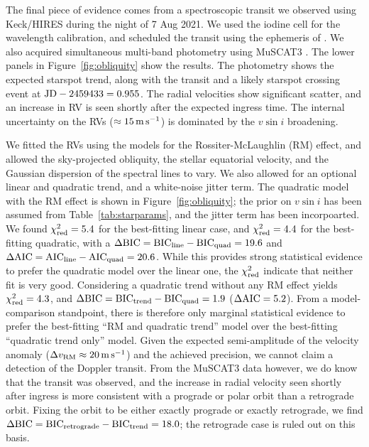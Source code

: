 \documentclass[12pt,modern,twocolumn,tighten]{aastex63}
\begin{document}
The final piece of evidence comes from a spectroscopic transit we
observed using Keck/HIRES during the night of 7 Aug 2021.  We
used the iodine cell for the wavelength calibration, and scheduled the
transit using the ephemeris of \citet{holczer_transit_2016}.  We also acquired
simultaneous multi-band photometry using MuSCAT3 \citep{Narita_2020}.
The lower panels in Figure~\ref{fig:obliquity} show the results.  The
photometry shows the expected starspot trend, along with the transit
and a likely starspot crossing event at ${\rm JD} - 2459433 = 0.955$.
The radial velocities show significant scatter, and an
increase in RV is seen shortly after the expected ingress time.  The
internal uncertainty on the RVs ($\approx 15\,{\rm m\,s}^{-1}$) is
dominated by the $v\sin i$ broadening.

%
%
%
% 

We fitted the RVs using the \citet{hirano_analytic_2010,hirano_2011}
models for the Rossiter-McLaughlin (RM) effect, and allowed the
sky-projected obliquity, the stellar equatorial velocity, and the
Gaussian dispersion of the spectral lines to vary.  We also allowed
for an optional linear and quadratic trend, and a white-noise jitter
term.  The quadratic model with the RM effect is shown in
Figure~\ref{fig:obliquity}; the prior on $v\sin i$ has been assumed
from Table~\ref{tab:starparams}, and the jitter term has been
incorpoarted.
We found $\chi^2_{\rm red} =
5.4$ for the best-fitting linear case, and $\chi^2_{\rm red} = 4.4$
for the best-fitting quadratic, with a $\Delta {\rm BIC} = {\rm
BIC}_{\rm line} - {\rm BIC}_{\rm quad} = 19.6$ and $\Delta {\rm AIC} =
{\rm AIC}_{\rm line} - {\rm AIC}_{\rm quad} = 20.6$.  While this
provides strong statistical evidence to prefer the quadratic model
over the linear one, the $\chi^2_{\rm red}$ indicate that neither fit
is very good.  Considering a quadratic trend without any RM
effect yields $\chi^2_{\rm red} = 4.3$, and $\Delta {\rm BIC} = {\rm
BIC}_{\rm trend} - {\rm BIC}_{\rm quad} = 1.9$ ($\Delta {\rm
AIC}=5.2$).  From a model-comparison standpoint, there is therefore
only marginal statistical evidence to prefer the best-fitting ``RM and
quadratic trend'' model over the best-fitting ``quadratic trend only''
model.  Given the expected semi-amplitude of the velocity anomaly
($\Delta v_{\rm RM}\approx 20\,{\rm m\,s}^{-1}$) and the achieved precision,
we cannot claim a detection of the Doppler transit.
From the MuSCAT3 data however, we do know that the transit
was observed, and the increase in radial velocity seen shortly after
ingress is more consistent with a prograde or polar orbit than a
retrograde orbit.  Fixing the orbit to be either exactly prograde or
exactly retrograde, we find $\Delta {\rm BIC} = {\rm BIC}_{\rm
retrograde} - {\rm BIC}_{\rm trend} = 18.0$; the retrograde case is
ruled out on this basis.
\end{document}
